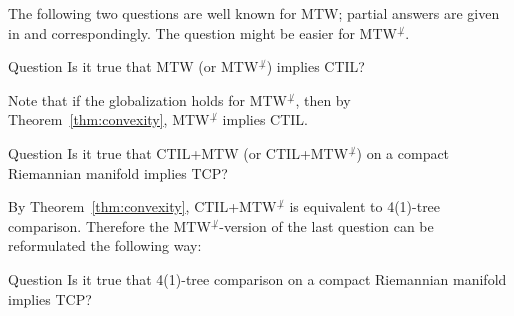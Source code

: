 The following two questions are well known for MTW;
partial answers are given in \cite{MTW+CTIL+} and \cite{loeper} correspondingly.
The question might be easier for MTW$^{\not\perp}$.

\begin{thm}{Question}
Is it true that MTW (or MTW$^{\not\perp}$) implies CTIL?
\end{thm}

Note that if the globalization holds for MTW$^{\not\perp}$, then by Theorem~\ref{thm:convexity}, MTW$^{\not\perp}$ implies CTIL.

\begin{thm}{Question}
Is it true that CTIL+MTW (or CTIL+MTW$^{\not\perp}$) on a compact Riemannian manifold implies TCP?
\end{thm}

By Theorem~\ref{thm:convexity}, CTIL+MTW$^{\not\perp}$ is equivalent to 4(1)-tree comparison. 
Therefore the MTW$^{\not\perp}$-version of the last question can be reformulated the following way:

\begin{thm}{Question} Is it true that 4(1)-tree comparison on a compact Riemannian manifold implies TCP?
\end{thm}

